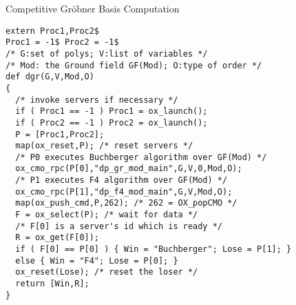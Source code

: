 \documentclass{slides}
\begin{document}
\newpage
\noindent
{\color{green} Competitive Gr\"obner Basis Computation}
\begin{verbatim}
extern Proc1,Proc2$
Proc1 = -1$ Proc2 = -1$
/* G:set of polys; V:list of variables */
/* Mod: the Ground field GF(Mod); O:type of order */
def dgr(G,V,Mod,O)
{
  /* invoke servers if necessary */
  if ( Proc1 == -1 ) Proc1 = ox_launch();
  if ( Proc2 == -1 ) Proc2 = ox_launch();
  P = [Proc1,Proc2];
  map(ox_reset,P); /* reset servers */
  /* P0 executes Buchberger algorithm over GF(Mod) */
  ox_cmo_rpc(P[0],"dp_gr_mod_main",G,V,0,Mod,O);
  /* P1 executes F4 algorithm over GF(Mod) */
  ox_cmo_rpc(P[1],"dp_f4_mod_main",G,V,Mod,O);
  map(ox_push_cmd,P,262); /* 262 = OX_popCMO */
  F = ox_select(P); /* wait for data */
  /* F[0] is a server's id which is ready */
  R = ox_get(F[0]);
  if ( F[0] == P[0] ) { Win = "Buchberger"; Lose = P[1]; }
  else { Win = "F4"; Lose = P[0]; }
  ox_reset(Lose); /* reset the loser */
  return [Win,R];
}
\end{verbatim}
\newpage
\end{document}
